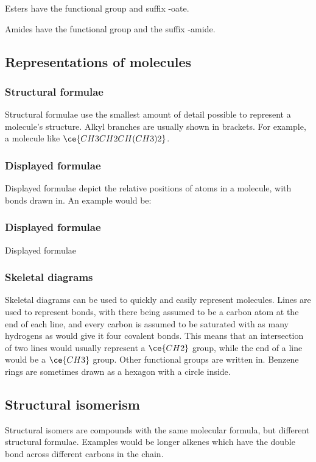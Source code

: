 Esters have the functional group  and suffix -oate.

Amides have the functional group  and the suffix -amide.

\subsection{Representations of molecules}
\subsubsection{Structural formulae}
Structural formulae use the smallest amount of detail possible to represent a molecule's structure. Alkyl branches are usually shown in brackets. For example, a molecule like $\ce{CH3CH2CH(CH3)2}$.

\subsubsection{Displayed formulae}
Displayed formulae depict the relative positions of atoms in a molecule, with bonds drawn in. An example would be:


\subsubsection{Displayed formulae}
Displayed formulae 
\subsubsection{Skeletal diagrams}
Skeletal diagrams can be used to quickly and easily represent molecules. Lines are used to represent bonds, with there being assumed to be a carbon atom at the end of each line, and every carbon is assumed to be saturated with as many hydrogens as would give it four covalent bonds. This means that an intersection of two lines would usually represent a $\ce{CH2}$ group, while the end of a line would be a $\ce{CH3}$ group. Other functional groups are written in. Benzene rings are sometimes drawn as a hexagon with a circle inside.

\subsection{Structural isomerism}
Structural isomers are compounds with the same molecular formula, but different structural formulae. Examples would be longer alkenes which have the double bond across different carbons in the chain.

